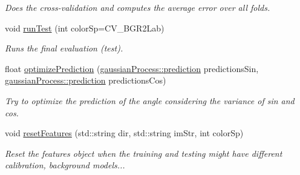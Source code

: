 \begin{DoxyCompactItemize}
\begin{DoxyCompactList}\small\item\em Does the cross-\/validation and computes the average error over all folds. \item\end{DoxyCompactList}\item 
\hypertarget{classclassifyImages_ad2677b8124cb8786b2010e8dae88669a}{
void \hyperlink{classclassifyImages_ad2677b8124cb8786b2010e8dae88669a}{runTest} (int colorSp=CV\_\-BGR2Lab)}
\label{classclassifyImages_ad2677b8124cb8786b2010e8dae88669a}

\begin{DoxyCompactList}\small\item\em Runs the final evaluation (test). \item\end{DoxyCompactList}\item 
\hypertarget{classclassifyImages_aad3c0217620ac5b8e8fa3590e0e2d119}{
float \hyperlink{classclassifyImages_aad3c0217620ac5b8e8fa3590e0e2d119}{optimizePrediction} (\hyperlink{structgaussianProcess_1_1prediction}{gaussianProcess::prediction} predictionsSin, \hyperlink{structgaussianProcess_1_1prediction}{gaussianProcess::prediction} predictionsCos)}
\label{classclassifyImages_aad3c0217620ac5b8e8fa3590e0e2d119}

\begin{DoxyCompactList}\small\item\em Try to optimize the prediction of the angle considering the variance of sin and cos. \item\end{DoxyCompactList}\item 
\hypertarget{classclassifyImages_a2ed910a41a307f926f5d48e3d8a0c584}{
void \hyperlink{classclassifyImages_a2ed910a41a307f926f5d48e3d8a0c584}{resetFeatures} (std::string dir, std::string imStr, int colorSp)}
\label{classclassifyImages_a2ed910a41a307f926f5d48e3d8a0c584}

\begin{DoxyCompactList}\small\item\em Reset the features object when the training and testing might have different calibration, background models... \item\end{DoxyCompactList}\end{DoxyCompactItemize}
